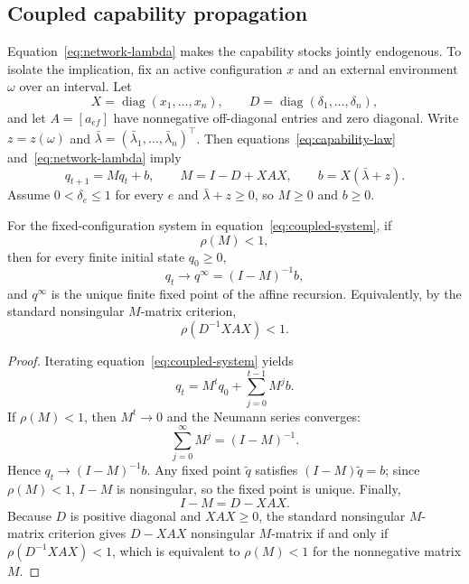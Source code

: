 \subsection{Coupled capability propagation}
\label{subsec:coupled}

Equation~\eqref{eq:network-lambda} makes the capability stocks jointly endogenous. To isolate the implication, fix an active configuration $x$ and an external environment $\omega$ over an interval. Let
\[
X=\operatorname{diag}(x_1,\ldots,x_n),
\qquad
D=\operatorname{diag}(\delta_1,\ldots,\delta_n),
\]
and let $A=[a_{ef}]$ have nonnegative off-diagonal entries and zero diagonal. Write $z=z(\omega)$ and $\bar\lambda=(\bar\lambda_1,\ldots,\bar\lambda_n)^\top$. Then equations~\eqref{eq:capability-law} and~\eqref{eq:network-lambda} imply
\begin{equation}
q_{t+1}
=
Mq_t+b,
\qquad
M=I-D+XAX,
\qquad
b=X(\bar\lambda+z).
\label{eq:coupled-system}
\end{equation}
Assume $0<\delta_e\le1$ for every $e$ and $\bar\lambda+z\ge0$, so $M\ge0$ and $b\ge0$.

\begin{proposition}
\label{prop:spectral-stability}
For the fixed-configuration system in equation~\eqref{eq:coupled-system}, if
\begin{equation}
\rho(M)<1,
\label{eq:spectral-condition}
\end{equation}
then for every finite initial state $q_0\ge0$,
\begin{equation}
q_t\longrightarrow q^\infty=(I-M)^{-1}b,
\label{eq:network-steady-state}
\end{equation}
and $q^\infty$ is the unique finite fixed point of the affine recursion. Equivalently, by the standard nonsingular $M$-matrix criterion,
\begin{equation}
\rho\!\left(D^{-1}XAX\right)<1.
\label{eq:m-matrix-condition}
\end{equation}
\end{proposition}

\begin{proof}
Iterating equation~\eqref{eq:coupled-system} yields
\[
q_t=M^tq_0+\sum_{j=0}^{t-1}M^j b.
\]
If $\rho(M)<1$, then $M^t\to0$ and the Neumann series converges:
\[
\sum_{j=0}^{\infty}M^j=(I-M)^{-1}.
\]
Hence $q_t\to(I-M)^{-1}b$. Any fixed point $\tilde q$ satisfies $(I-M)\tilde q=b$; since $\rho(M)<1$, $I-M$ is nonsingular, so the fixed point is unique. Finally,
\[
I-M=D-XAX.
\]
Because $D$ is positive diagonal and $XAX\ge0$, the standard nonsingular $M$-matrix criterion gives $D-XAX$ nonsingular $M$-matrix if and only if $\rho(D^{-1}XAX)<1$, which is equivalent to $\rho(M)<1$ for the nonnegative matrix $M$.
\end{proof}

